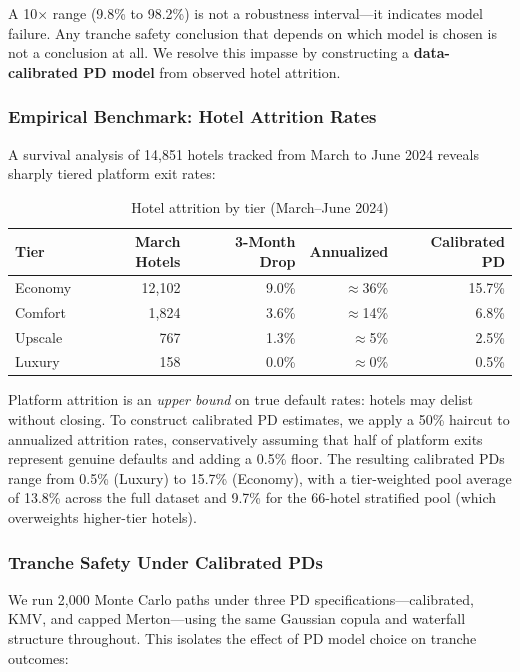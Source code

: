 \documentclass[12pt,a4paper]{article}
\begin{document}
A 10$\times$ range (9.8\% to 98.2\%) is not a robustness interval---it indicates model failure.
Any tranche safety conclusion that depends on which model is chosen is not a conclusion at all.
We resolve this impasse by constructing a \textbf{data-calibrated PD model} from observed hotel attrition.

\subsubsection{Empirical Benchmark: Hotel Attrition Rates}

A survival analysis of 14,851 hotels tracked from March to June 2024 reveals sharply tiered platform exit rates:

\begin{table}[H]
\centering
\caption{Hotel attrition by tier (March--June 2024)}
\label{tab:attrition}
\begin{tabular}{@{}lrrrr@{}}
\toprule
\textbf{Tier} & \textbf{March Hotels} & \textbf{3-Month Drop} & \textbf{Annualized} & \textbf{Calibrated PD} \\
\midrule
Economy    & 12,102 & 9.0\% & $\approx$36\% & 15.7\% \\
Comfort    &  1,824 & 3.6\% & $\approx$14\% &  6.8\% \\
Upscale    &    767 & 1.3\% & $\approx$5\%  &  2.5\% \\
Luxury     &    158 & 0.0\% & $\approx$0\%  &  0.5\% \\
\bottomrule
\end{tabular}
\end{table}

Platform attrition is an \emph{upper bound} on true default rates: hotels may delist without closing.
To construct calibrated PD estimates, we apply a 50\% haircut to annualized attrition rates, conservatively assuming that half of platform exits represent genuine defaults and adding a 0.5\% floor.
The resulting calibrated PDs range from 0.5\% (Luxury) to 15.7\% (Economy), with a tier-weighted pool average of 13.8\% across the full dataset and 9.7\% for the 66-hotel stratified pool (which overweights higher-tier hotels).

\subsubsection{Tranche Safety Under Calibrated PDs}

We run 2,000 Monte Carlo paths under three PD specifications---calibrated, KMV, and capped Merton---using the same Gaussian copula and waterfall structure throughout.
This isolates the effect of PD model choice on tranche outcomes:
\end{document}
